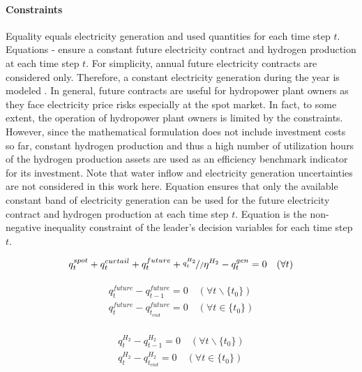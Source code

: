 \documentclass[review]{elsarticle}
\begin{document}
\paragraph{Constraints} Equality  equals electricity generation and used quantities for each time step $t$. Equations - ensure a constant future electricity contract and hydrogen production at each time step $t$. For simplicity, annual future electricity contracts are considered only. Therefore, a constant electricity generation during the year is modeled . In general, future contracts are useful for hydropower plant owners as they face electricity price risks especially at the spot market. In fact, to some extent, the operation of hydropower plant owners is limited by the constraints. However, since the mathematical formulation does not include investment costs so far, constant hydrogen production and thus a high number of utilization hours of the hydrogen production assets are used as an efficiency benchmark indicator for its investment. Note that water inflow and electricity generation uncertainties are not considered in this work here. Equation  ensures that only the available constant band of electricity generation can be used for the future electricity contract and hydrogen production at each time step $t$. Equation  is the non-negative inequality constraint of the leader's decision variables for each time step $t$.

\begin{align}\label{L1}
	q_{t}^{spot} + q_{t}^{curtail} + q_{t}^{future} + \nicefrac{q_{t}^{H_2}}/{\eta^{H_2}} - q_{t}^{gen} = 0 \quad (\forall t)
\end{align}

\begin{align}\label{L3}
\begin{aligned}
q_{t}^{future} - q_{t-1}^{future} = 0 \quad (\forall t \backslash \{t_0\})\\
q_{t}^{future} - q_{t_{end}}^{future} = 0 \quad (\forall t \in \{t_0\})
\end{aligned}
\end{align}

\begin{align}\label{L5}
\begin{aligned}
q_{t}^{H_2} - q_{t-1}^{H_2} = 0 \quad (\forall t \backslash \{t_0\})\\
q_{t}^{H_2} - q_{t_{end}}^{H_2} = 0 \quad (\forall t \in \{t_0\})
\end{aligned}
\end{align}
\end{document}
